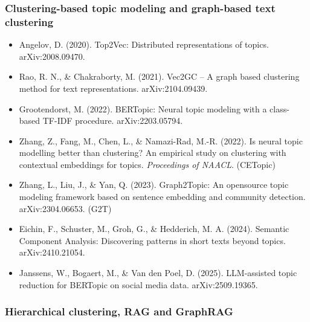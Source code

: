 \documentclass[
]{article}
\providecommand{\tightlist}{%
  \setlength{\itemsep}{0pt}\setlength{\parskip}{0pt}}
\begin{document}
\subsubsection{Clustering-based topic modeling and graph-based text
clustering}\label{clustering-based-topic-modeling-and-graph-based-text-clustering}

\begin{itemize}
\tightlist
\item
  Angelov, D. (2020). Top2Vec: Distributed representations of topics.
  arXiv:2008.09470.
\item
  Rao, R. N., \& Chakraborty, M. (2021). Vec2GC -- A graph based
  clustering method for text representations. arXiv:2104.09439.
\item
  Grootendorst, M. (2022). BERTopic: Neural topic modeling with a
  class-based TF-IDF procedure. arXiv:2203.05794.
\item
  Zhang, Z., Fang, M., Chen, L., \& Namazi-Rad, M.-R. (2022). Is neural
  topic modelling better than clustering? An empirical study on
  clustering with contextual embeddings for topics. \emph{Proceedings of
  NAACL}. (CETopic)
\item
  Zhang, L., Liu, J., \& Yan, Q. (2023). Graph2Topic: An opensource
  topic modeling framework based on sentence embedding and community
  detection. arXiv:2304.06653. (G2T)
\item
  Eichin, F., Schuster, M., Groh, G., \& Hedderich, M. A. (2024).
  Semantic Component Analysis: Discovering patterns in short texts
  beyond topics. arXiv:2410.21054.
\item
  Janssens, W., Bogaert, M., \& Van den Poel, D. (2025). LLM-assisted
  topic reduction for BERTopic on social media data. arXiv:2509.19365.
\end{itemize}

\subsubsection{Hierarchical clustering, RAG and
GraphRAG}\label{hierarchical-clustering-rag-and-graphrag}
\end{document}
